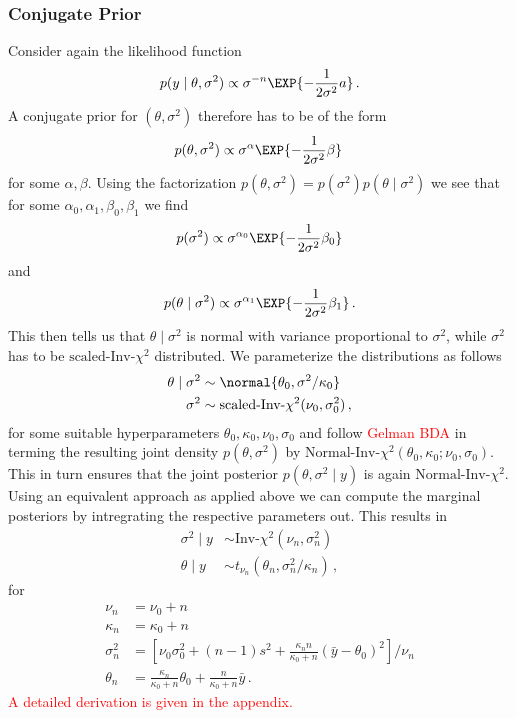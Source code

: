 \subsubsection*{Conjugate Prior}
Consider again the likelihood function
\begin{align}
  p(y \mid \theta, \sigma^2) \propto \sigma^{-n} \EXP{-\frac{1}{2\sigma^2}a} \,.
\end{align}
A conjugate prior for $(\theta, \sigma^2)$ therefore has to be of the form
\begin{align}
  p(\theta, \sigma^2) \propto \sigma^\alpha \EXP{-\frac{1}{2\sigma^2} \beta} \,
\end{align}
for some $\alpha, \beta$. Using the factorization $p(\theta, \sigma^2) = p(\sigma^2) p(\theta \mid \sigma^2)$
we see that for some $\alpha_0, \alpha_1, \beta_0, \beta_1$ we find
\begin{align}
  p(\sigma^2) \propto \sigma^{\alpha_0} \EXP{-\frac{1}{2\sigma^2} \beta_0}
\end{align}
and
\begin{align}
  p(\theta \mid \sigma^2) \propto \sigma^{\alpha_1} \EXP{-\frac{1}{2\sigma^2} \beta_1} \,.
\end{align}
This then tells us that $\theta \mid \sigma^2$ is normal with variance proportional
to $\sigma^2$, while $\sigma^2$ has to be $\text{scaled-Inv-}\chi^2$ distributed.
We parameterize the distributions as follows
\begin{align}
  \theta \mid \sigma^2 &\sim \normal{\theta_0, \sigma^2/\kappa_0}\\
  \sigma^2 &\sim \text{scaled-Inv-}\chi^2(\nu_0, \sigma_0^2) \,,
\end{align}
for some suitable hyperparameters $\theta_0, \kappa_0, \nu_0, \sigma_0$ and follow
\textcolor{red}{Gelman BDA} in terming the resulting joint density
$p(\theta, \sigma^2)$ by $\text{Normal-Inv-}\chi^2(\theta_0, \kappa_0; \nu_0, \sigma_0)$.
This in turn ensures that the joint posterior $p(\theta, \sigma^2 \mid y)$ is again
$\text{Normal-Inv-}\chi^2$. Using an equivalent approach as applied above we can
compute the marginal posteriors by intregrating the respective parameters out.
This results in
\begin{align}
  \sigma^2 \mid y &\sim \text{Inv-}\chi^2(\nu_n, \sigma_n^2)\\
  \theta \mid y &\sim t_{\nu_n}(\theta_n, \sigma_n^2 / \kappa_n) \,,
\end{align}
for
\begin{align}
  \nu_n &= \nu_0 + n\\
  \kappa_n &= \kappa_0 + n\\
  \sigma_n^2 &= \left[\nu_0 \sigma_0^2 + (n-1)s^2 + \frac{\kappa_n n}{\kappa_0 + n} (\bar{y} - \theta_0)^2\right] /\nu_n\\
  \theta_n &=\frac{\kappa_n}{\kappa_0 + n}\theta_0 + \frac{n}{\kappa_0 + n}\bar{y} \,.
\end{align}
\textcolor{red}{A detailed derivation is given in the appendix.}


